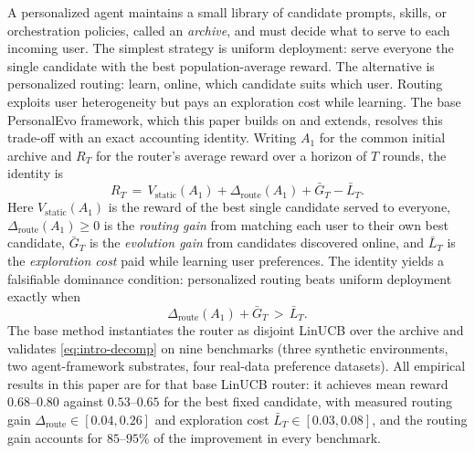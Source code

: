 \documentclass{article} %
\begin{document}
A personalized agent maintains a small library of candidate prompts, skills, or orchestration policies, called an \emph{archive}, and must decide what to serve to each incoming user. The simplest strategy is uniform deployment: serve everyone the single candidate with the best population-average reward. The alternative is personalized routing: learn, online, which candidate suits which user. Routing exploits user heterogeneity but pays an exploration cost while learning. The base PersonalEvo framework, which this paper builds on and extends, resolves this trade-off with an exact accounting identity. Writing $A_1$ for the common initial archive and $R_T$ for the router's average reward over a horizon of $T$ rounds, the identity is
\begin{equation}
\label{eq:intro-decomp}
R_T
\,=\,
V_{\mathrm{static}}(A_1)
+
\Delta_{\mathrm{route}}(A_1)
+
\bar G_T
-
\bar L_T .
\end{equation}
Here $V_{\mathrm{static}}(A_1)$ is the reward of the best single candidate served to everyone, $\Delta_{\mathrm{route}}(A_1)\ge 0$ is the \emph{routing gain} from matching each user to their own best candidate, $\bar G_T$ is the \emph{evolution gain} from candidates discovered online, and $\bar L_T$ is the \emph{exploration cost} paid while learning user preferences. The identity yields a falsifiable dominance condition: personalized routing beats uniform deployment exactly when
\begin{equation}
\label{eq:intro-dominance}
\Delta_{\mathrm{route}}(A_1) + \bar G_T \,>\, \bar L_T .
\end{equation}
The base method instantiates the router as disjoint LinUCB over the archive and validates \eqref{eq:intro-decomp} on nine benchmarks (three synthetic environments, two agent-framework substrates, four real-data preference datasets). All empirical results in this paper are for that base LinUCB router: it achieves mean reward $0.68$--$0.80$ against $0.53$--$0.65$ for the best fixed candidate, with measured routing gain $\Delta_{\mathrm{route}} \in [0.04, 0.26]$ and exploration cost $\bar L_T \in [0.03, 0.08]$, and the routing gain accounts for $85$--$95\%$ of the improvement in every benchmark.
\end{document}
